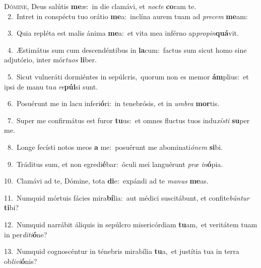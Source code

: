 \lettrine{\initial\textcolor{\initialcolor}{D}}{ómine,} Deus salútis \textbf{me}\-æ:~\star in die clamávi, et \textit{noc}\-\textit{te} \textbf{co}\-ram te.\\
{\numbfont\textcolor{\numbcolor}{~2.}}~Intret in conspéctu tuo orátio \textbf{me}\-a:~\star inclína aurem tuam ad \textit{pre}\-\textit{cem} \textbf{me}\-am:\par
{\numbfont\textcolor{\numbcolor}{~3.}}~Quia repléta est malis ánima \textbf{me}\-a:~\star et vita mea inférno ap\-\textit{pro}\-\textit{pin}\textbf{quá}vit.\par
{\numbfont\textcolor{\numbcolor}{~4.}}~Æstimátus sum cum descendéntibus in \textbf{la}\-cum:~\star factus sum sicut homo sine adjutório, inter mór\-\textit{tu}\-\textit{os} \textbf{li}\-ber.\par
{\numbfont\textcolor{\numbcolor}{~5.}}~Sicut vulneráti dormiéntes in sepúlcris,~\dagger quorum non es memor \textbf{ám}\-plius:~\star et ipsi de manu tu\textit{a} \textit{re}\-\textbf{púl}si sunt.\par
{\numbfont\textcolor{\numbcolor}{~6.}}~Posuérunt me in lacu inferi\-\textbf{ó}\-ri:~\star in tenebrósis, et in \textit{um}\-\textit{bra} \textbf{mor}\-tis.\par
{\numbfont\textcolor{\numbcolor}{~7.}}~Super me confirmátus est furor \textbf{tu}\-us:~\star et omnes fluctus tuos indu\-\textit{xís}\-\textit{ti} \textbf{su}\-per me.\par
{\numbfont\textcolor{\numbcolor}{~8.}}~Longe fecísti notos meos \textbf{a} me:~\star posuérunt me abominati\-\textit{ó}\-\textit{nem} \textbf{si}\-bi.\par
{\numbfont\textcolor{\numbcolor}{~9.}}~Tráditus sum, et non egredi\-\textbf{é}\-bar:~\star óculi mei languérunt \textit{præ} \textit{in}\-\textbf{ó}pia.\par
{\numbfont\textcolor{\numbcolor}{10.}}~Clamávi ad te, Dómine, tota \textbf{di}\-e:~\star expándi ad te \textit{ma}\-\textit{nus} \textbf{me}\-as.\par
{\numbfont\textcolor{\numbcolor}{11.}}~Numquid mórtuis fácies mira\-\textbf{bí}\-lia:~\star aut médici suscitábunt, et confite\-\textit{bún}\-\textit{tur} \textbf{ti}\-bi?\par
{\numbfont\textcolor{\numbcolor}{12.}}~Numquid narrábit áliquis in sepúlcro misericórdiam \textbf{tu}\-am,~\star et veritátem tuam in per\-\textit{di}\-\textit{ti}\textbf{ó}ne?\par
{\numbfont\textcolor{\numbcolor}{13.}}~Numquid cognoscéntur in ténebris mirabília \textbf{tu}\-a,~\star et justítia tua in terra ob\-\textit{li}\-\textit{vi}\textbf{ó}nis?\par

